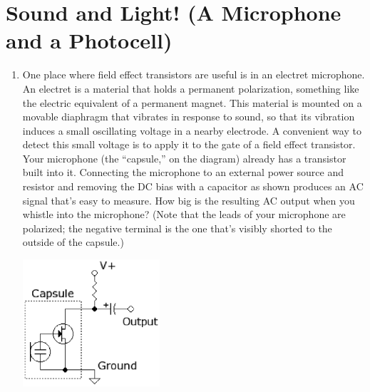 \section{Sound and Light! (A Microphone and a Photocell)}
\label{lab_microphone_photocell}


\bigskip

\begin{enumerate}[wide]

\item One place where field effect transistors are useful is in an electret microphone.  An electret is a material that holds a permanent polarization, something like the electric equivalent of a permanent magnet.  This material is mounted on a movable diaphragm that vibrates in response to sound, so that its vibration induces a small oscillating voltage in a nearby electrode.  A convenient way to detect this small voltage is to apply it to the gate of a field effect transistor.  Your microphone (the ``capsule,'' on the diagram) already has a transistor built into it.  Connecting the microphone to an external power source and resistor and removing the DC bias with a capacitor as shown produces an AC signal that's easy to measure.  How big is the resulting AC output when you whistle into the microphone?   (Note that the leads of your microphone are polarized; the negative terminal is the one that's visibly shorted to the outside of the capsule.)  
\begin{center}
\includegraphics[width=2in]{microphone_photocell/microphone_schematic.eps}
\end{center}


\end{enumerate}
